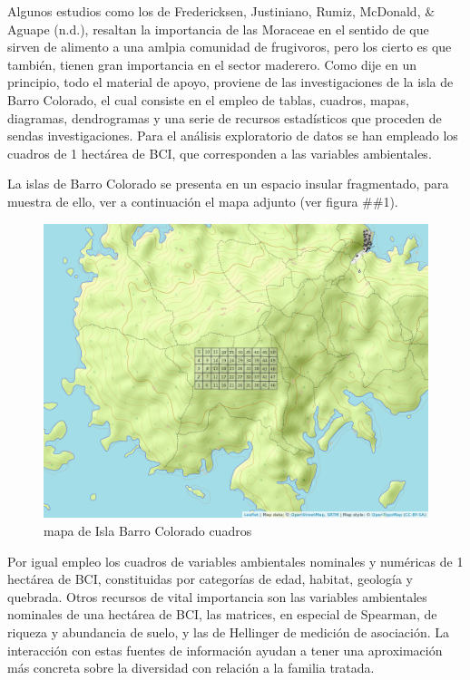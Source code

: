 \documentclass[11pt,]{article}
\begin{document}
Algunos estudios como los de Fredericksen, Justiniano, Rumiz, McDonald,
\& Aguape (n.d.), resaltan la importancia de las Moraceae en el sentido
de que sirven de alimento a una amlpia comunidad de frugivoros, pero los
cierto es que también, tienen gran importancia en el sector maderero.
Como dije en un principio, todo el material de apoyo, proviene de las
investigaciones de la isla de Barro Colorado, el cual consiste en el
empleo de tablas, cuadros, mapas, diagramas, dendrogramas y una serie de
recursos estadísticos que proceden de sendas investigaciones. Para el
análisis exploratorio de datos se han empleado los cuadros de 1 hectárea
de BCI, que corresponden a las variables ambientales.

La islas de Barro Colorado se presenta en un espacio insular
fragmentado, para muestra de ello, ver a continuación el mapa adjunto
(ver figura \#\#1).

\begin{figure}
\centering
\includegraphics[width=1.00000\textwidth]{mapa_cuadros.png}
\caption{mapa de Isla Barro Colorado cuadros\label{fig:bci_map}}
\end{figure}

Por igual empleo los cuadros de variables ambientales nominales y
numéricas de 1 hectárea de BCI, constituidas por categorías de edad,
habitat, geología y quebrada. Otros recursos de vital importancia son
las variables ambientales nominales de una hectárea de BCI, las
matrices, en especial de Spearman, de riqueza y abundancia de suelo, y
las de Hellinger de medición de asociación. La interacción con estas
fuentes de información ayudan a tener una aproximación más concreta
sobre la diversidad con relación a la familia tratada.
\end{document}
